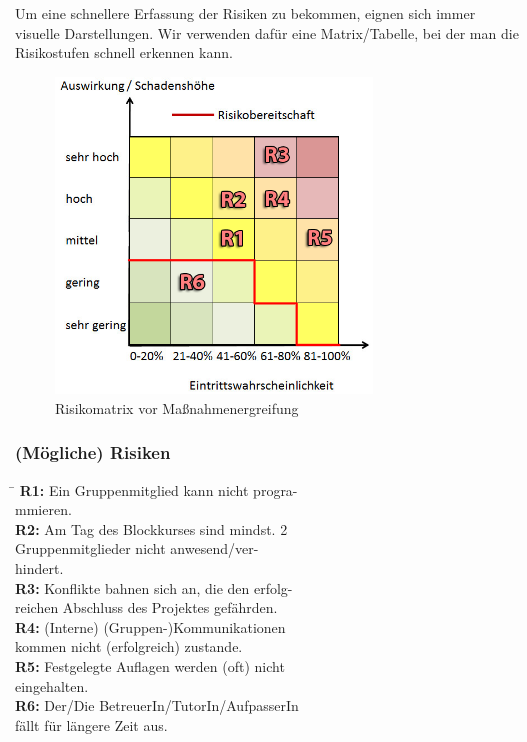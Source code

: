 \documentclass[fontsize=12pt,paper=a4,twoside]{scrartcl}
\begin{document}
Um eine schnellere Erfassung der Risiken zu bekommen, eignen sich immer visuelle Darstellungen. Wir verwenden dafür eine Matrix/Tabelle, bei der man die Risikostufen schnell erkennen kann.\\

\begin{figure}[H]
	\centering
	\includegraphics[width=0.75\textwidth]{src/risikomatrix_before.png}
	\caption{Risikomatrix vor Maßnahmenergreifung}
	\label{fig:matrixtable_before}
\end{figure}

\subsubsection{(Mögliche) Risiken}


\begin{tabbing}
	\hspace*{5em}\= \kill
	\textbf{R1:}\> Ein Gruppenmitglied kann nicht progra-\\
				\> mmieren.\\[0.5em]
	\textbf{R2:}\> Am Tag des Blockkurses sind mindst. 2\\
				\> Gruppenmitglieder nicht anwesend/ver-\\
				\> hindert.\\[0.5em]
	\textbf{R3:}\> Konflikte bahnen sich an, die den erfolg-\\
				\> reichen Abschluss des Projektes gefährden.\\[0.5em]
	\textbf{R4:}\> (Interne) (Gruppen-)Kommunikationen\\ 
				\> kommen nicht (erfolgreich) zustande.\\[0.5em]
	\textbf{R5:}\> Festgelegte Auflagen werden (oft) nicht\\
				\> eingehalten.\\[0.5em]
	\textbf{R6:}\> Der/Die BetreuerIn/TutorIn/AufpasserIn\\
				\> fällt für längere Zeit aus.\\[0.5em]
\end{tabbing} 
\end{document}
